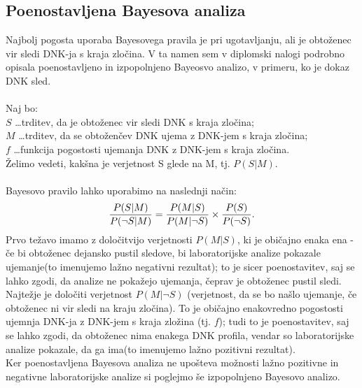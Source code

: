 \documentclass[12pt,a4paper]{amsart}
\theoremstyle{definition} %
\theoremstyle{plain} %
\begin{document}
\subsection{Poenostavljena Bayesova analiza}
Najbolj pogosta uporaba Bayesovega pravila je pri ugotavljanju, ali je obtoženec vir sledi DNK-ja s kraja zločina. V ta namen sem v diplomski 
nalogi podrobno opisala poenostavljeno in izpopolnjeno Bayeosvo analizo, v primeru, ko je dokaz DNK sled.\\\\
Naj bo:\\
$S$ \dots trditev, da je obtoženec vir sledi DNK s kraja zločina; \\
$M$ \dots trditev, da se obtoženčev DNK ujema z DNK-jem s kraja zločina; \\
$f$ \dots funkcija pogostosti ujemanja DNK z DNK-jem s kraja zločina. \\
Želimo vedeti, kakšna je verjetnost S glede na M, tj. $P(S \lvert M)$. \\\\
Bayesovo pravilo lahko uporabimo na naslednji način:
\[
   \frac{P(S \lvert M)}{P(\neg S \lvert M)} = \frac{P(M \lvert S)}{P(M \lvert \neg S)} \times \frac{P(S)}{P(\neg S)}. \vspace{2mm}
\]
Prvo težavo imamo z določitvijo verjetnosti $P(M \lvert S)$, ki je običajno enaka ena - če bi obtoženec dejansko pustil sledove, bi laboratorijske 
analize pokazale ujemanje(to imenujemo lažno negativni rezultat); to je sicer poenostavitev, saj se lahko zgodi, da analize ne pokažejo ujemanja, 
čeprav je obtoženec pustil sledi.\\
Najtežje je določiti verjetnost $P(M \lvert \neg S)$ (verjetnost, da se bo našlo ujemanje, če obtoženec ni vir sledi na kraju zločina). To je
običajno enakovredno pogostosti ujemnja DNK-ja z DNK-jem s kraja zložina (tj. $f$); tudi to je poenostavitev, saj se lahko zgodi, da
obtoženec nima enakega DNK profila, vendar so laboratorijske analize pokazale, da ga ima(to imenujemo lažno pozitivni rezultat). \\
Ker poenostavljena Bayesova analiza ne upošteva možnosti lažno pozitivne in negativne laboratorijske analize si poglejmo še izpopolnjeno
Bayesovo analizo.

\end{document}
